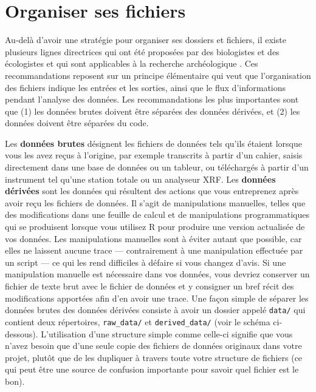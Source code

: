 \documentclass[
  french,
]{scrbook}
\begin{document}
\hypertarget{organiser-ses-fichiers}{%
\section{Organiser ses fichiers}\label{organiser-ses-fichiers}}

Au-delà d'avoir une stratégie pour organiser ses dossiers et fichiers, il existe plusieurs lignes directrices qui ont été proposées par des biologistes et des écologistes et qui sont applicables à la recherche archéologique \autocite{noble2009,white2013}. Ces recommandations reposent sur un principe élémentaire qui veut que l'organisation des fichiers indique les entrées et les sorties, ainsi que le flux d'informations pendant l'analyse des données. Les recommandations les plus importantes sont que (1) les données brutes doivent être séparées des données dérivées, et (2) les données doivent être séparées du code.

Les \textbf{données brutes} désignent les fichiers de données tels qu'ils étaient lorsque vous les avez reçus à l'origine, par exemple transcrits à partir d'un cahier, saisis directement dans une base de données ou un tableur, ou téléchargés à partir d'un instrument tel qu'une station totale ou un analyseur XRF. Les \textbf{données dérivées} sont les données qui résultent des actions que vous entreprenez après avoir reçu les fichiers de données. Il s'agit de manipulations manuelles, telles que des modifications dans une feuille de calcul et de manipulations programmatiques qui se produisent lorsque vous utilisez R pour produire une version actualisée de vos données. Les manipulations manuelles sont à éviter autant que possible, car elles ne laissent aucune trace --- contrairement à une manipulation effectuée par un script --- ce qui les rend difficiles à défaire si vous changez d'avis. Si une manipulation manuelle est nécessaire dans vos données, vous devriez conserver un fichier de texte brut avec le fichier de données et y consigner un bref récit des modifications apportées afin d'en avoir une trace. Une façon simple de séparer les données brutes des données dérivées consiste à avoir un dossier appelé \texttt{data/} qui contient deux répertoires, \texttt{raw\_data/} et \texttt{derived\_data/} (voir le schéma ci-dessous). L'utilisation d'une structure simple comme celle-ci signifie que vous n'avez besoin que d'une seule copie des fichiers de données originaux dans votre projet, plutôt que de les dupliquer à travers toute votre structure de fichiers (ce qui peut être une source de confusion importante pour savoir quel fichier est le bon).
\end{document}
